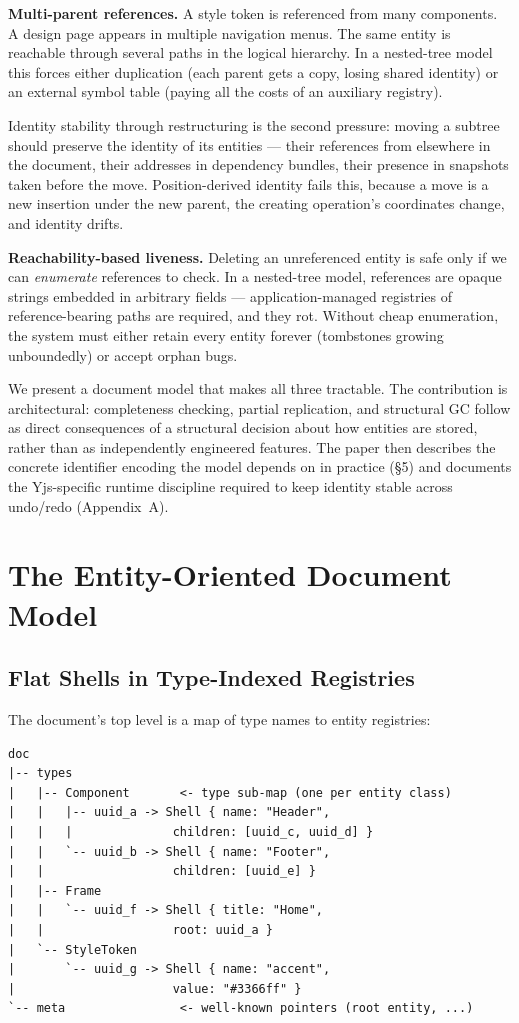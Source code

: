 \textbf{Multi-parent references.} A style token is referenced from many components. A design page appears in multiple navigation menus. The same entity is reachable through several paths in the logical hierarchy. In a nested-tree model this forces either duplication (each parent gets a copy, losing shared identity) or an external symbol table (paying all the costs of an auxiliary registry).

Identity stability through restructuring is the second pressure: moving a subtree should preserve the identity of its entities --- their references from elsewhere in the document, their addresses in dependency bundles, their presence in snapshots taken before the move. Position-derived identity fails this, because a move is a new insertion under the new parent, the creating operation's coordinates change, and identity drifts.

\textbf{Reachability-based liveness.} Deleting an unreferenced entity is safe only if we can \emph{enumerate} references to check. In a nested-tree model, references are opaque strings embedded in arbitrary fields --- application-managed registries of reference-bearing paths are required, and they rot. Without cheap enumeration, the system must either retain every entity forever (tombstones growing unboundedly) or accept orphan bugs.

We present a document model that makes all three tractable. The contribution is architectural: completeness checking, partial replication, and structural GC follow as direct consequences of a structural decision about how entities are stored, rather than as independently engineered features. The paper then describes the concrete identifier encoding the model depends on in practice (\S5) and documents the Yjs-specific runtime discipline required to keep identity stable across undo/redo (Appendix~A).

\section{The Entity-Oriented Document Model}

\subsection{Flat Shells in Type-Indexed Registries}

The document's top level is a map of type names to entity registries:

\begin{lstlisting}
doc
|-- types
|   |-- Component       <- type sub-map (one per entity class)
|   |   |-- uuid_a -> Shell { name: "Header",
|   |   |              children: [uuid_c, uuid_d] }
|   |   `-- uuid_b -> Shell { name: "Footer",
|   |                  children: [uuid_e] }
|   |-- Frame
|   |   `-- uuid_f -> Shell { title: "Home",
|   |                  root: uuid_a }
|   `-- StyleToken
|       `-- uuid_g -> Shell { name: "accent",
|                      value: "#3366ff" }
`-- meta                <- well-known pointers (root entity, ...)
\end{lstlisting}

